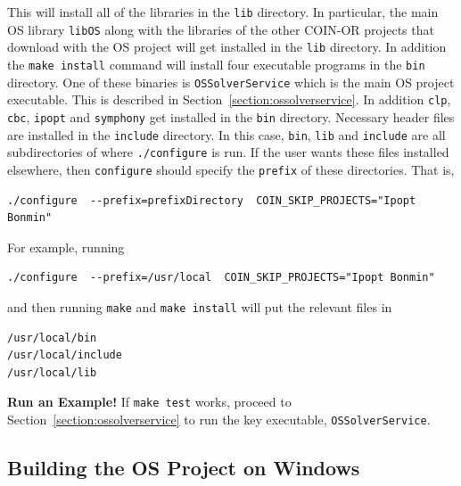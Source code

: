 \documentclass[11pt]{article}
\renewcommand{\_}{{\char"5F}}
\renewcommand{\{}{{\char"7B}}
\renewcommand{\}}{{\char"7D}}
\renewcommand{\^}{{\char"0D}}
\renewcommand{\'}{{\char"0D}}
\begin{document}
\begin{enumerate}[{\bf Step 1:}]
This will install all of the libraries in the  {\tt lib} directory.  In particular, the main OS library 
{\tt libOS}
along with the libraries of the other COIN-OR projects  that download with the OS project will get installed 
in the {\tt lib} directory.  In addition the {\tt make install} command will install four executable programs in 
the {\tt bin} directory.  One of these binaries is {\tt OSSolverService} 
which is the main OS project executable. 
This is described in Section~\ref{section:ossolverservice}. In addition {\tt clp}, 
{\tt cbc}, {\tt ipopt} and {\tt symphony} 
get installed  in the {\tt bin} directory.  
Necessary header files are installed in the {\tt include} directory.   In this case, {\tt bin}, {\tt lib} 
and {\tt include} are all subdirectories of where {\tt ./configure} is run.   If the user wants these files 
installed elsewhere, then {\tt configure} should specify the {\tt prefix} of these directories.  That is,


\begin{verbatim}
./configure  --prefix=prefixDirectory  COIN_SKIP_PROJECTS="Ipopt Bonmin"
\end{verbatim}

For example, running

\begin{verbatim}
./configure  --prefix=/usr/local  COIN_SKIP_PROJECTS="Ipopt Bonmin"
\end{verbatim}

\noindent and then running {\tt make} and {\tt make install} will put the relevant files in

\begin{verbatim}
/usr/local/bin
/usr/local/include
/usr/local/lib
\end{verbatim}

\end{enumerate}

\vskip 8pt

{\bf Run an Example!}  If {\tt make test} works, proceed to Section~\ref{section:ossolverservice} to run the key executable, {\tt OSSolverService}.







\subsection{Building the OS Project on Windows}\label{section:windowsinstall}
\end{document}
